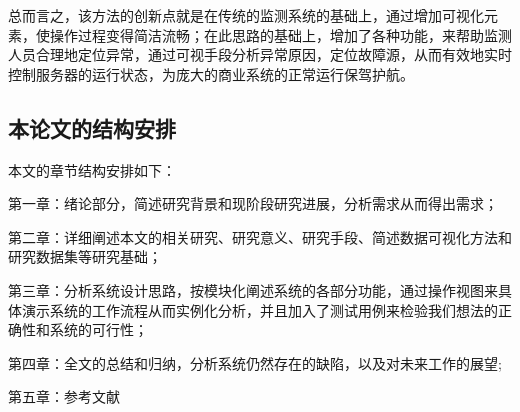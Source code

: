 总而言之，该方法的创新点就是在传统的监测系统的基础上，通过增加可视化元素，使操作过程变得简洁流畅；在此思路的基础上，增加了各种功能，来帮助监测人员合理地定位异常，通过可视手段分析异常原因，定位故障源，从而有效地实时控制服务器的运行状态，为庞大的商业系统的正常运行保驾护航。

\subsection{本论文的结构安排}
本文的章节结构安排如下：

第一章：绪论部分，简述研究背景和现阶段研究进展，分析需求从而得出需求；

第二章：详细阐述本文的相关研究、研究意义、研究手段、简述数据可视化方法和研究数据集等研究基础；

第三章：分析系统设计思路，按模块化阐述系统的各部分功能，通过操作视图来具体演示系统的工作流程从而实例化分析，并且加入了测试用例来检验我们想法的正确性和系统的可行性；

第四章：全文的总结和归纳，分析系统仍然存在的缺陷，以及对未来工作的展望;

第五章：参考文献

\newpage